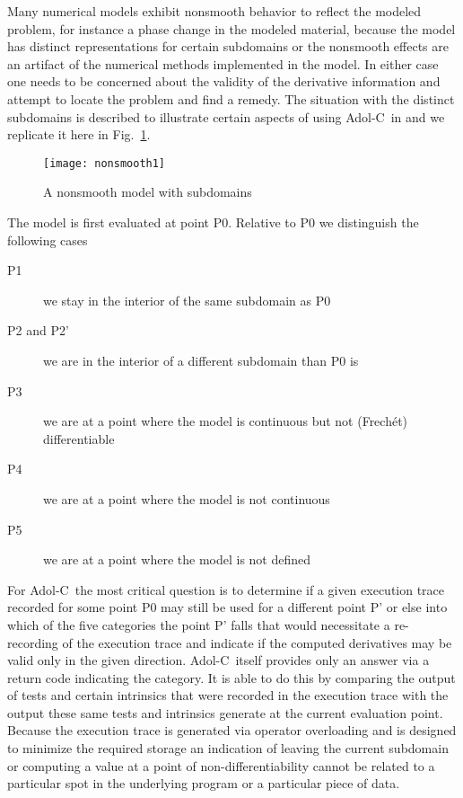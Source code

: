 \documentclass{article}
\newcommand{\adolc}{Adol-C}
\newcommand{\reffig}[1]{{Fig.~\ref{#1}}}
\begin{document}
Many numerical models exhibit nonsmooth behavior to reflect the modeled problem, 
for instance a phase change in the modeled material, because the 
model has distinct representations for certain subdomains or the nonsmooth effects 
are an artifact of the numerical methods implemented in the model.
In either case one needs to be concerned about the validity of the 
derivative information and attempt to locate the problem and  find a remedy.  
The situation with the distinct subdomains is described to illustrate 
certain aspects of using \adolc\  in \cite{adolc} and we 
replicate it here in \reffig{fig:subdomains}. 
\begin{figure}
\centerline{\texttt{[image: nonsmooth1]}}
\caption{A nonsmooth model with subdomains}\label{fig:subdomains} 
\end{figure}
The model is first evaluated at point P0.  Relative to P0 we distinguish the 
following cases
\begin{description}
\item[P1] we stay in the interior of the same subdomain as P0 
\item[P2 and P2'] we are in the interior of a different subdomain than P0 is
\item[P3] we are at a point where the model is continuous but not (Frech\'et) differentiable
\item[P4] we are at a point where the model is not continuous
\item[P5] we are at a point where the model is not defined
\end{description}    
For \adolc\  the most critical question is to determine if a given execution trace 
recorded for some point P0 may still be used for a different point P' or else 
into which of the five categories  the point P' falls that would necessitate 
a re-recording of the execution trace and indicate if the computed derivatives 
may be valid only in the given direction. \adolc\  itself provides only an answer 
via a return code indicating the category. 
It is able to do this by comparing the output of tests and certain intrinsics 
that were recorded in the execution trace with the output these same tests and intrinsics 
generate at the current evaluation point. 
Because the execution trace is generated via operator overloading and is designed to 
minimize the required storage an indication of leaving the current subdomain or computing 
a value at a point of non-differentiability cannot be related to a particular spot in 
the underlying program or a particular piece of data. 
\end{document}
